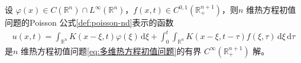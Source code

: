 \documentclass[../../main.tex]{subfiles}%
\begin{document}
\begin{theorem}
设 $\varphi(x)\in C(\mathbb{R}^n)\cap L^\infty(\mathbb{R}^n)$，$f(x,t)\in C^{0,1}(\mathbb{R}_+^{n+1})$，则$n$ 维热方程初值问题的Poisson 公式\eqref{def:poisson-nd}表示的函数
\begin{align*}
u(x,t)= \int_{\mathbb{R}^n}K(x-\xi,t)\varphi(\xi)\,\mathrm{d}\xi
+\int_0^t\int_{\mathbb{R}^n}K(x-\xi,t-\tau)f(\xi,\tau)\,\mathrm{d}\xi\,\mathrm{d}\tau
\end{align*}
是$n$ 维热方程初值问题\eqref{eq:多维热方程初值问题}的有界 $C^\infty(\mathbb{R}_+^{n+1})$ 解。
\end{theorem}
\end{document}
